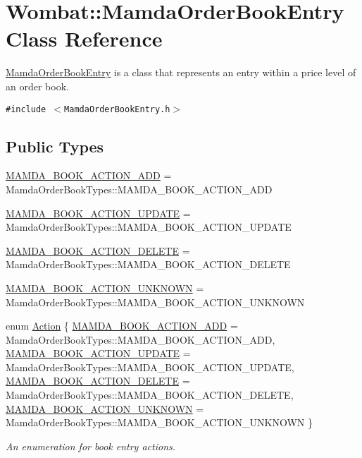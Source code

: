 \hypertarget{classWombat_1_1MamdaOrderBookEntry}{
\section{Wombat::Mamda\-Order\-Book\-Entry Class Reference}
\label{classWombat_1_1MamdaOrderBookEntry}
}
\hyperlink{classWombat_1_1MamdaOrderBookEntry}{Mamda\-Order\-Book\-Entry} is a class that represents an entry within a price level of an order book.  


{\tt \#include $<$Mamda\-Order\-Book\-Entry.h$>$}

\subsection*{Public Types}
\begin{CompactItemize}
\item 
\hyperlink{classWombat_1_1MamdaOrderBookEntry_fc6cb1d67c7601d093a36f59cf9bcef466fb1d9c39c7abfcf3a432b58926d157}{MAMDA\_\-BOOK\_\-ACTION\_\-ADD} = Mamda\-Order\-Book\-Types::MAMDA\_\-BOOK\_\-ACTION\_\-ADD
\item 
\hyperlink{classWombat_1_1MamdaOrderBookEntry_fc6cb1d67c7601d093a36f59cf9bcef426db32b982503db4ade08f2d09952530}{MAMDA\_\-BOOK\_\-ACTION\_\-UPDATE} = Mamda\-Order\-Book\-Types::MAMDA\_\-BOOK\_\-ACTION\_\-UPDATE
\item 
\hyperlink{classWombat_1_1MamdaOrderBookEntry_fc6cb1d67c7601d093a36f59cf9bcef41b058536086b44fb87d75096a72ac807}{MAMDA\_\-BOOK\_\-ACTION\_\-DELETE} = Mamda\-Order\-Book\-Types::MAMDA\_\-BOOK\_\-ACTION\_\-DELETE
\item 
\hyperlink{classWombat_1_1MamdaOrderBookEntry_fc6cb1d67c7601d093a36f59cf9bcef4050d930aa82af0d23736d2cf7b3c8527}{MAMDA\_\-BOOK\_\-ACTION\_\-UNKNOWN} = Mamda\-Order\-Book\-Types::MAMDA\_\-BOOK\_\-ACTION\_\-UNKNOWN
\item 
enum \hyperlink{classWombat_1_1MamdaOrderBookEntry_fc6cb1d67c7601d093a36f59cf9bcef4}{Action} \{ \hyperlink{classWombat_1_1MamdaOrderBookEntry_fc6cb1d67c7601d093a36f59cf9bcef466fb1d9c39c7abfcf3a432b58926d157}{MAMDA\_\-BOOK\_\-ACTION\_\-ADD} =  Mamda\-Order\-Book\-Types::MAMDA\_\-BOOK\_\-ACTION\_\-ADD, 
\hyperlink{classWombat_1_1MamdaOrderBookEntry_fc6cb1d67c7601d093a36f59cf9bcef426db32b982503db4ade08f2d09952530}{MAMDA\_\-BOOK\_\-ACTION\_\-UPDATE} =  Mamda\-Order\-Book\-Types::MAMDA\_\-BOOK\_\-ACTION\_\-UPDATE, 
\hyperlink{classWombat_1_1MamdaOrderBookEntry_fc6cb1d67c7601d093a36f59cf9bcef41b058536086b44fb87d75096a72ac807}{MAMDA\_\-BOOK\_\-ACTION\_\-DELETE} =  Mamda\-Order\-Book\-Types::MAMDA\_\-BOOK\_\-ACTION\_\-DELETE, 
\hyperlink{classWombat_1_1MamdaOrderBookEntry_fc6cb1d67c7601d093a36f59cf9bcef4050d930aa82af0d23736d2cf7b3c8527}{MAMDA\_\-BOOK\_\-ACTION\_\-UNKNOWN} =  Mamda\-Order\-Book\-Types::MAMDA\_\-BOOK\_\-ACTION\_\-UNKNOWN
 \}
\begin{CompactList}\small\item\em An enumeration for book entry actions. \item\end{CompactList}\end{CompactItemize}
